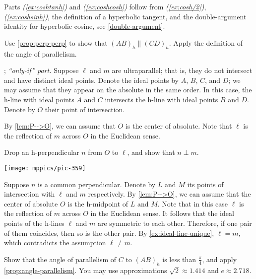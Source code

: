 \begin{multicols}{2}
Parts \textit{(\ref{ex:coshtanh})} and \textit{(\ref{ex:coshcosh})} follow from \textit{(\ref{ex:cosh/2})}, \textit{(\ref{ex:coshsinh})}, the definition of a hyperbolic tangent, and the double-argument identity for hyperbolic cosine, see \ref{double-argument}.

\setcounter{eqtn}{0}

 Use \ref{prop:perp-perp} to show that $(AB)_h\parallel (CD)_h$.
Apply the definition of the angle of parallelism.

\parbf{\ref{ex:ultra-parallel}}; \textit{``only-if'' part.} Suppose $\ell$ and $m$ are ultraparallel; that is, they do not intersect and have distinct ideal points.
Denote the ideal points by $A$, $B$, $C$, and $D$;
we may assume that they appear on the absolute in the same order.
In this case, the h-line with ideal points $A$ and $C$ intersects the h-line with ideal points $B$ and $D$.
Denote by $O$ their point of intersection.

By \ref{lem:P-->O}, we can assume that $O$ is the center of absolute.
Note that $\ell$ is the reflection of $m$ across $O$ in the Euclidean sense.

Drop an h-perpendicular $n$ from $O$ to $\ell$, and
show that $n\perp m$.

\begin{Figure}
\vskip-0mm
\centering
\texttt{[image: mppics/pic-359]}
\end{Figure}

Suppose $n$ is a common perpendicular.
Denote by $L$ and $M$ its points of intersection with $\ell$ and $m$ respectively.
By \ref{lem:P-->O}, we can assume that the center of absolute $O$ is the h-midpoint of $L$ and $M$.
Note that in this case $\ell$ is the reflection of $m$ across $O$ in the Euclidean sense.
It follows that the ideal points of the h-lines $\ell$ and $m$ are symmetric to each other.
Therefore, if one pair of them coincides, then so is the other pair. 
By \ref{ex:ideal-line-unique}, $\ell=m$, which contradicts the assumption $\ell\ne m$.

 Show that the angle of parallelism of $C$ to $(AB)_h$ is less than $\tfrac\pi4$, and apply \ref{prop:angle-parallelism}.
You may use approximations $\sqrt2\approx 1.414$ and $e\approx2.718$.



\end{multicols}
